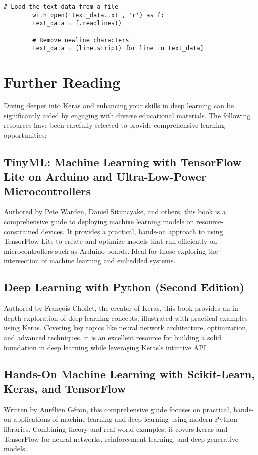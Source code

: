 	\begin{lstlisting}[caption={Loading Text Data from a File}, label={code:load-text}, style=pythonstyle]
		# Load the text data from a file
		with open('text_data.txt', 'r') as f:
		text_data = f.readlines()
		
		# Remove newline characters
		text_data = [line.strip() for line in text_data]
	\end{lstlisting}
	
	\section{Further Reading}
	Diving deeper into Keras and enhancing your skills in deep learning can be significantly aided by engaging with diverse educational materials. The following resources have been carefully selected to provide comprehensive learning opportunities:

	\subsection{TinyML: Machine Learning with TensorFlow Lite on Arduino and Ultra-Low-Power Microcontrollers}  
	Authored by Pete Warden, Daniel Situnayake, and others, this book is a comprehensive guide to deploying machine learning models on resource-constrained devices. It provides a practical, hands-on approach to using TensorFlow Lite to create and optimize models that run efficiently on microcontrollers such as Arduino boards. Ideal for those exploring the intersection of machine learning and embedded systems.\cite{Warden:2020}
	
	\subsection{Deep Learning with Python (Second Edition)}
	Authored by François Chollet, the creator of Keras, this book provides an in-depth exploration of deep learning concepts, illustrated with practical examples using Keras. Covering key topics like neural network architecture, optimization, and advanced techniques, it is an excellent resource for building a solid foundation in deep learning while leveraging Keras's intuitive API. \cite{Chollet:2018}
	
	\subsection{Hands-On Machine Learning with Scikit-Learn, Keras, and TensorFlow}
	Written by Aurélien Géron, this comprehensive guide focuses on practical, hands-on applications of machine learning and deep learning using modern Python libraries. Combining theory and real-world examples, it covers Keras and TensorFlow for neural networks, reinforcement learning, and deep generative models.\cite{Geron:2019}
	
